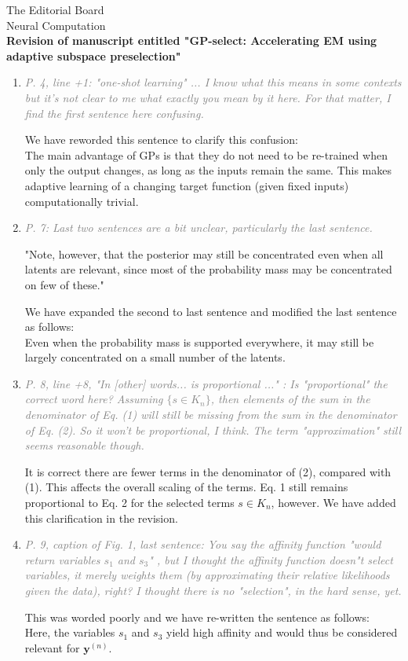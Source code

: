 \documentclass[10pt]{letter}
\newcommand{\rvr}[1]{\textcolor{gray}{#1}}
\renewcommand{\vec}[1]{{\mathbf{#1}}}
\begin{document}
\begin{letter}{
The Editorial Board\\
Neural Computation\\
\vspace{10mm}
\textbf{Revision of manuscript entitled "GP-select: Accelerating EM using adaptive
subspace preselection"}
}
\begin{enumerate}[topsep=3pt,itemsep=2ex,partopsep=1ex,parsep=1ex]
    \item \rvr{\emph{P. 4, line +1: "one-shot learning" ... I know what this means in some contexts but it's not clear to me what exactly you mean by it here. For that matter, I find the first sentence here confusing.}}

    We have reworded this sentence to clarify this confusion:\\
     The main advantage of GPs is that they do not need to be re-trained when only the output changes, as long as the inputs remain the same. This makes adaptive learning of a changing target function (given fixed inputs) computationally trivial.


    \item \rvr{\emph{P. 7: Last two sentences are a bit unclear, particularly the last sentence.}}

"Note, however, that the posterior may still be concentrated even when all latents are relevant, since most of the probability mass may be concentrated on few of these."

We have expanded the second to last sentence and modified the last sentence as follows:\\
Even when the probability mass is supported everywhere, it may still be largely concentrated on a small number of the latents.

    \item \rvr{\emph{ P. 8, line +8,   "In [other] words... is proportional ..." : Is "proportional"  the correct word here? Assuming $\{ s \in K_n \}$, then elements of the sum in the denominator of Eq. (1) will still be missing from the sum in the denominator of Eq. (2). So it won't be proportional, I think. The term "approximation" still seems reasonable though.}}

It is correct there are fewer terms in the denominator of (2), compared with (1). This affects the overall scaling of the terms. Eq. 1 still remains proportional to Eq. 2 for the selected terms $s\in K_n$, however. 
We have added this clarification in the revision.

    \item \rvr{\emph{P. 9, caption of Fig. 1, last sentence: You say the affinity function "would return variables $s_1$ and $s_3$" , but I thought the affinity function doesn"t select variables, it merely weights them (by approximating their relative likelihoods given the data), right? I thought there is no "selection", in the hard sense, yet.}}

    This was worded poorly and we have re-written the sentence as follows: \\
Here, the variables $s_1$ and $s_3$ yield high affinity and would thus be considered relevant for $\vec{y}^{(n)}$.


\end{enumerate}
\end{letter}
\end{document}
